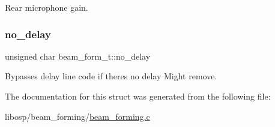 Rear microphone gain. 

\mbox{\label{structbeam__form__t_a6358c3b8f9b4940a50c7fe48bade9e6b}} 
\subsubsection{\texorpdfstring{no\+\_\+delay}{no\_delay}}
{\footnotesize\ttfamily unsigned char beam\+\_\+form\+\_\+t\+::no\+\_\+delay}



Bypasses delay line code if there\textquotesingle{}s no delay Might remove. 



The documentation for this struct was generated from the following file\+:\begin{DoxyCompactItemize}
\item 
libosp/beam\+\_\+forming/\mbox{\hyperlink{beam__forming_8c}{beam\+\_\+forming.\+c}}\end{DoxyCompactItemize}
